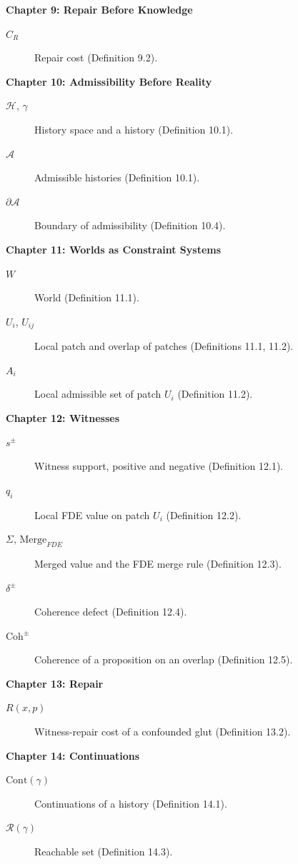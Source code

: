 \documentclass[11pt]{book}
\begin{document}
\noindent\textbf{Chapter 9: Repair Before Knowledge}
\begin{description}
\item[$C_R$] Repair cost (Definition 9.2).
\end{description}

\noindent\textbf{Chapter 10: Admissibility Before Reality}
\begin{description}
\item[$\mathcal H$, $\gamma$] History space and a history (Definition 10.1).
\item[$\mathcal A$] Admissible histories (Definition 10.1).
\item[$\partial \mathcal A$] Boundary of admissibility (Definition 10.4).
\end{description}

\noindent\textbf{Chapter 11: Worlds as Constraint Systems}
\begin{description}
\item[$W$] World (Definition 11.1).
\item[$U_i$, $U_{ij}$] Local patch and overlap of patches (Definitions 11.1, 11.2).
\item[$A_i$] Local admissible set of patch $U_i$ (Definition 11.2).
\end{description}

\noindent\textbf{Chapter 12: Witnesses}
\begin{description}
\item[$s^\pm$] Witness support, positive and negative (Definition 12.1).
\item[$q_i$] Local FDE value on patch $U_i$ (Definition 12.2).
\item[$\Sigma$, $\mathrm{Merge}_{FDE}$] Merged value and the FDE merge rule (Definition 12.3).
\item[$\delta^\pm$] Coherence defect (Definition 12.4).
\item[$\mathrm{Coh}^\pm$] Coherence of a proposition on an overlap (Definition 12.5).
\end{description}

\noindent\textbf{Chapter 13: Repair}
\begin{description}
\item[$R(x,p)$] Witness-repair cost of a confounded glut (Definition 13.2).
\end{description}

\noindent\textbf{Chapter 14: Continuations}
\begin{description}
\item[$\mathrm{Cont}(\gamma)$] Continuations of a history (Definition 14.1).
\item[$\mathcal R(\gamma)$] Reachable set (Definition 14.3).
\end{description}
\end{document}
